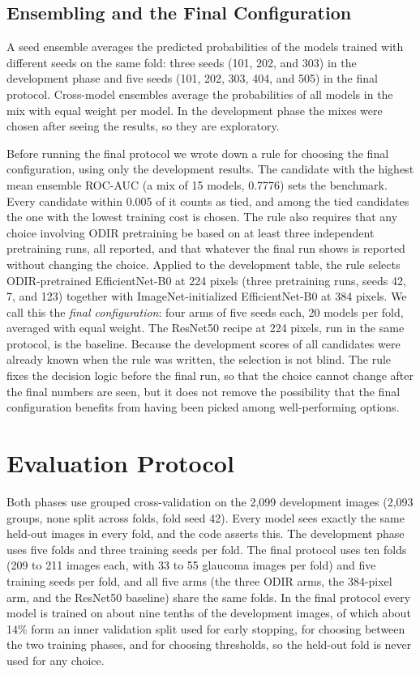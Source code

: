 \subsection{Ensembling and the Final Configuration}
A seed ensemble averages the predicted probabilities of the models trained with different seeds on the same fold: three seeds (101, 202, and 303) in the development phase and five seeds (101, 202, 303, 404, and 505) in the final protocol. Cross-model ensembles average the probabilities of all models in the mix with equal weight per model. In the development phase the mixes were chosen after seeing the results, so they are exploratory.

Before running the final protocol we wrote down a rule for choosing the final configuration, using only the development results. The candidate with the highest mean ensemble ROC-AUC (a mix of 15 models, 0.7776) sets the benchmark. Every candidate within 0.005 of it counts as tied, and among the tied candidates the one with the lowest training cost is chosen. The rule also requires that any choice involving ODIR pretraining be based on at least three independent pretraining runs, all reported, and that whatever the final run shows is reported without changing the choice. Applied to the development table, the rule selects ODIR-pretrained EfficientNet-B0 at 224 pixels (three pretraining runs, seeds 42, 7, and 123) together with ImageNet-initialized EfficientNet-B0 at 384 pixels. We call this the \emph{final configuration}: four arms of five seeds each, 20 models per fold, averaged with equal weight. The ResNet50 recipe at 224 pixels, run in the same protocol, is the baseline. Because the development scores of all candidates were already known when the rule was written, the selection is not blind. The rule fixes the decision logic before the final run, so that the choice cannot change after the final numbers are seen, but it does not remove the possibility that the final configuration benefits from having been picked among well-performing options.

\section{Evaluation Protocol}
\label{sec:protocol}
Both phases use grouped cross-validation on the 2,099 development images (2,093 groups, none split across folds, fold seed 42). Every model sees exactly the same held-out images in every fold, and the code asserts this. The development phase uses five folds and three training seeds per fold. The final protocol uses ten folds (209 to 211 images each, with 33 to 55 glaucoma images per fold) and five training seeds per fold, and all five arms (the three ODIR arms, the 384-pixel arm, and the ResNet50 baseline) share the same folds. In the final protocol every model is trained on about nine tenths of the development images, of which about 14\% form an inner validation split used for early stopping, for choosing between the two training phases, and for choosing thresholds, so the held-out fold is never used for any choice.

